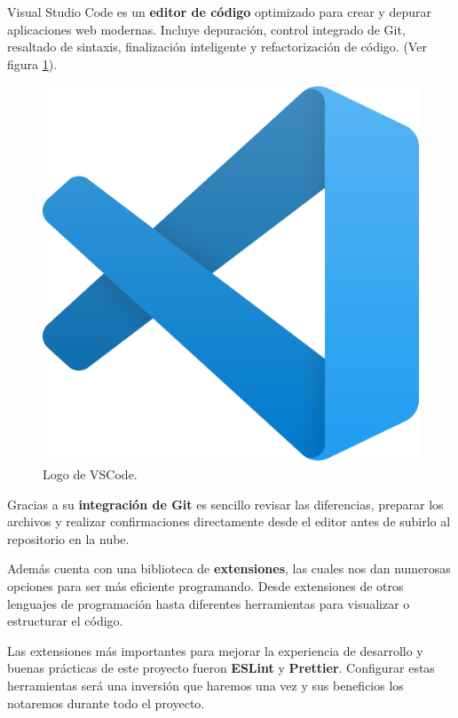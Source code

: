 \documentclass[12pt,twoside,titlepage]{report}
\begin{document}
Visual Studio Code es un \textbf{editor de código} optimizado para crear y depurar aplicaciones web modernas. Incluye depuración, control integrado de Git, resaltado de sintaxis, finalización inteligente y refactorización de código.
(Ver figura \ref{fig:VSCodeLogo}).

\begin{figure}[H]
    \centering
    \includegraphics[scale=0.035]{VSCode/VSCode}
    \caption{Logo de VSCode.}
    \label{fig:VSCodeLogo}
\end{figure}

Gracias a su \textbf{integración de Git} es sencillo revisar las diferencias, preparar los archivos y realizar confirmaciones directamente desde el editor antes de subirlo al repositorio en la nube.

Además cuenta con una biblioteca de \textbf{extensiones}, las cuales nos dan numerosas opciones para ser más eficiente programando. Desde extensiones de otros lenguajes de programación hasta diferentes herramientas para visualizar o estructurar el código.

Las extensiones más importantes para mejorar la experiencia de desarrollo y buenas prácticas de este proyecto fueron \textbf{ESLint} y \textbf{Prettier}. Configurar estas herramientas será una inversión que haremos una vez y sus beneficios los notaremos durante todo el proyecto.
\end{document}
